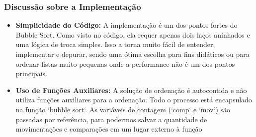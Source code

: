 \subsubsection{Discussão sobre a Implementação}
\begin{itemize}
    \item \textbf{Simplicidade do Código:} A implementação é um dos pontos fortes do Bubble Sort. Como visto no código, ela requer apenas dois laços aninhados e uma lógica de troca simples. Isso a torna muito fácil de entender, implementar e depurar, sendo uma ótima escolha para fins didáticos ou para ordenar listas muito pequenas onde a performance não é um dos pontos principais.

    \item \textbf{Uso de Funções Auxiliares:} A solução de ordenação é autocontida e não utiliza funções auxiliares para a ordenação. Todo o processo está encapsulado na função `bubble sort`. As variáveis de contagem (`comp` e `mov`) são passadas por referência, para podermos salvar a quantidade de movimentações e comparações em um lugar externo à função
\end{itemize}